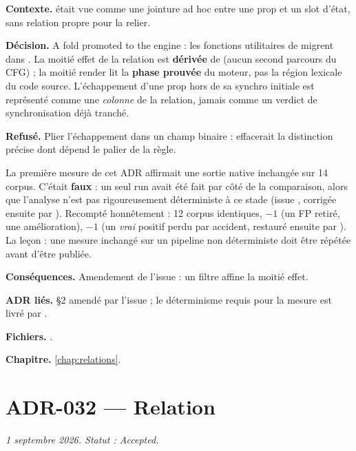 \textbf{Contexte.}  était vue comme une
jointure ad hoc entre une prop et un slot d'état, sans relation propre pour
la relier.

\textbf{Décision.} \og A fold promoted to the engine\fg{} : les fonctions
utilitaires de  migrent dans
. La moitié \og effet\fg{} de la relation est
\textbf{dérivée} de  (aucun second parcours du CFG) ;
la moitié \og render\fg{} lit la \textbf{phase prouvée} du moteur, pas la
région lexicale du code source. L'échappement d'une prop hors de sa synchro
initiale est représenté comme une \emph{colonne} de la relation, jamais comme
un verdict de synchronisation déjà tranché.

\textbf{Refusé.} Plier l'échappement dans un champ  binaire :
effacerait la distinction précise dont dépend le palier \Error{} de la règle.

\begin{piege}
La première mesure de cet ADR affirmait une sortie native \og inchangée sur
14 corpus\fg{}. C'était \textbf{faux} : un seul run avait été fait par côté de
la comparaison, alors que l'analyse n'est pas rigoureusement déterministe à
ce stade (issue , corrigée ensuite par ). Recompté
honnêtement : 12 corpus identiques,  $-1$ (un FP retiré, une
amélioration),  $-1$ (un \emph{vrai} positif perdu par accident,
restauré ensuite par ). La leçon : une mesure \og inchangé\fg{} sur un
pipeline non déterministe doit être répétée avant d'être publiée.
\end{piege}

\textbf{Conséquences.} Amendement de l'issue  : un filtre
 affine la moitié effet.

\textbf{ADR liés.} §2 amendé par l'issue  ; le déterminisme requis
pour la mesure est livré par .

\textbf{Fichiers.} .

\textbf{Chapitre.} \cref{chap:relations}.

\section{ADR-032 --- Relation }
\label{adr:32}
\noindent\textit{1{\ier} septembre 2026. Statut : Accepted.}

